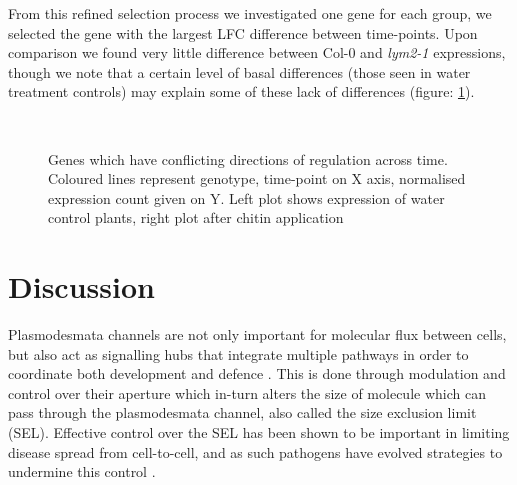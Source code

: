 \documentclass[../main.tex]{subfiles}
\begin{document}
From this refined selection process we investigated one gene for each group, we
selected the gene with the largest LFC difference between time-points. Upon
comparison we found very little difference between Col-0 and \textit{lym2-1}
expressions, though we note that a certain level of basal differences (those
seen in water treatment controls) may explain some of these lack of differences
(figure: \ref{fig:interestinggenes}).

\begin{figure}[!ht]
  \centering
  \\
  \caption[Genes which have conflicting directions of regulation across time]{Genes which have conflicting directions of regulation across time.
    Coloured lines represent genotype, time-point on X axis, normalised
    expression count given on Y. Left plot shows expression of water control
    plants, right plot after chitin application}
  \label{fig:interestinggenes}
\end{figure}


\section{Discussion}

Plasmodesmata channels are not only important for molecular flux between cells,
but also act as signalling hubs that integrate multiple pathways in order to
coordinate both development and defence
\cite{tilsnerStayingTightPlasmodesmal2016a}. This is done through modulation and
control over their aperture which in-turn alters the size of molecule which can pass
through the plasmodesmata channel, also called the size exclusion limit (SEL).
Effective control over the SEL has been shown to be important in limiting
disease spread from cell-to-cell, and as such pathogens have evolved strategies to undermine this
control \cite{caoFusariumOxysporumAvr2Six52018, thommaPAMPsEffectorsBlurred2011,
  loprestiHowFilamentousPlant2017}.
\end{document}
